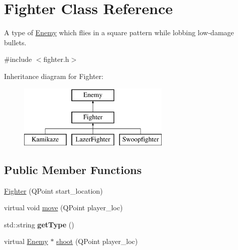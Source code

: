 \hypertarget{classFighter}{
\section{Fighter Class Reference}
\label{classFighter}
}


A type of \hyperlink{classEnemy}{Enemy} which flies in a square pattern while lobbing low-\/damage bullets.  




{\ttfamily \#include $<$fighter.h$>$}

Inheritance diagram for Fighter:\begin{figure}[H]
\begin{center}
\leavevmode
\includegraphics[height=3.000000cm]{classFighter}
\end{center}
\end{figure}
\subsection*{Public Member Functions}
\begin{DoxyCompactItemize}
\item 
\hyperlink{classFighter_a4c6bf191d7edaabfdddfdb1339b5871d}{Fighter} (QPoint start\_\-location)
\item 
virtual void \hyperlink{classFighter_a3d14fd498ce5ade49b5107e3cd296dce}{move} (QPoint player\_\-loc)
\item 
\hypertarget{classFighter_a6830b3650703ee2e08e7b451e7cccf5e}{
std::string {\bfseries getType} ()}
\label{classFighter_a6830b3650703ee2e08e7b451e7cccf5e}

\item 
virtual \hyperlink{classEnemy}{Enemy} $\ast$ \hyperlink{classFighter_aa5d46195ac8dcb7c83f61addcb5c2db5}{shoot} (QPoint player\_\-loc)
\end{DoxyCompactItemize}
